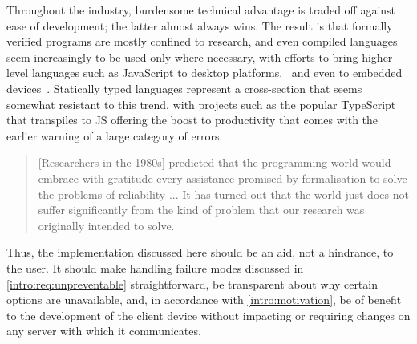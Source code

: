 Throughout the industry, burdensome technical advantage is traded off again\-st ease of development; the latter almost always wins. The result is that formally verified programs are mostly confined to research, and even compiled languages seem increasingly to be used only where necessary, with efforts to bring higher-level languages such as JavaScript to desktop platforms,~\cite{electron} and even to embedded devices~\cite{jerryscript}. Statically typed languages represent a cross-section that seems somewhat resistant to this trend, with projects such as the popular TypeScript~\cite{typescript} that transpiles to JS offering the boost to productivity that comes with the earlier warning of a large category of errors.

\begin{quote}
[Researchers in the 1980s] predicted that the programming world would embrace with gratitude every assistance promised by formalisation to solve the problems of reliability ... It has turned out that the world just does not suffer significantly from the kind of problem that our research was originally intended to solve. \cite{hoare_quote}
\end{quote}

Thus, the implementation discussed here should be an aid, not a hindrance, to the user. It should make handling failure modes discussed in \cref{intro:req:unpreventable} straightforward, be transparent about why certain options are unavailable, and, in accordance with \cref{intro:motivation}, be of benefit to the development of the client device without impacting or requiring changes on any server with which it communicates.